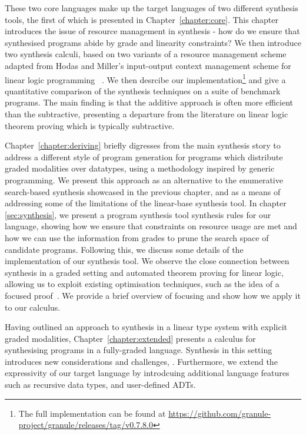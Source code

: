 These two core languages make up the target languages of two different synthesis
tools, the first of which is presented in Chapter~\ref{chapter:core}. This
chapter introduces the issue of resource management in synthesis - how do we
ensure that synthesised programs abide by grade and linearity constraints? We
then introduce two synthesis calculi, based on two variants of a resource
management scheme adapted from Hodas and Miller's input-output context
management scheme for linear logic programming ~\cite{HODAS1994327}. We then
desrcibe our implementation\footnote{The full implementation can be found at
\url{https://github.com/granule-project/granule/releases/tag/v0.7.8.0}} and give
a quantitative comparison of the synthesis techniques on a suite of benchmark
programs. The main finding is that the additive approach is often more efficient
than the subtractive, presenting a departure from the literature on linear logic
theorem proving which is typically subtractive.

Chapter~\ref{chapter:deriving} briefly digresses from the main synthesis story
to address a different style of program generation for programs which distribute
graded modalities over datatypes, using a methodology inspired by generic
programming. We present this approach as an alternative to the enumerative
search-based synthesis showcased in the previous chapter, and as a means of
addressing some of the limitations of the linear-base synthesis tool. In chapter
\ref{sec:synthesis}, we present a program synthesis tool synthesis rules for our
language, showing how we ensure that constraints on resource usage are met and
how we can use the information from grades to prune the search space of
candidate programs. Following this, we discuss some details of the
implementation of our synthesis tool. We observe the close connection between
synthesis in a graded setting and automated theorem proving for linear logic,
allowing us to exploit existing optimisation techniques, such as the idea of a
focused proof~\cite{focusing}. We provide a brief overview of focusing and show
how we apply it to our calculus. 

Having outlined an approach to synthesis in a linear type system with explicit
graded modalities, Chapter~\ref{chapter:extended} presents a calculus for 
synthesising programs in a fully-graded language. Synthesis in this setting 
introduces new considerations and challenges, . Furthermore, we extend the 
expressivity of our target language by introdcuing additional language features 
such as recursive data types, and user-defined ADTs. 

